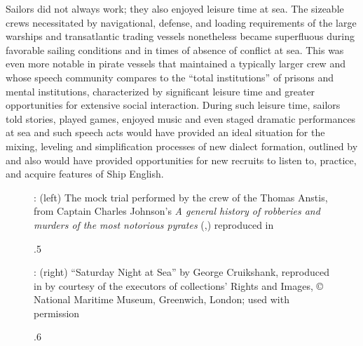 Sailors did not always work; they also enjoyed leisure time at sea. The sizeable crews necessitated by navigational, defense, and loading requirements of the large warships and transatlantic trading vessels nonetheless became superfluous during favorable sailing conditions and in times of absence of conflict at sea. This was even more notable in pirate vessels that maintained a typically larger crew and whose speech community \citet{Burg2001} compares to the “total institutions” of prisons and mental institutions, characterized by significant leisure time and greater opportunities for extensive social interaction. During such leisure time, sailors told stories, played games, enjoyed music and even staged dramatic performances at sea \citep[155]{Rediker2004} and such speech acts would have provided an ideal situation for the mixing, leveling and simplification processes of new dialect formation, outlined by \citet{Trudgill1986} and also would have provided opportunities for new recruits to listen to, practice, and acquire features of Ship English.

\begin{figure}

  
 

 
\caption{\label{fig:key:4}.5}: (left) The mock trial performed by the crew of the Thomas Anstis, from Captain Charles Johnson’s \textit{A general history of robberies and murders of the most notorious pyrates} (\citealt{London1724},) reproduced in \citet[156]{Rediker2004} 

\end{figure}

\begin{figure}

\caption{\label{fig:key:4}.6}: (right) “Saturday Night at Sea” by George Cruikshank, reproduced in \citet[29,]{Dibdin1841} by courtesy of the executors of collections’ Rights and Images, © National Maritime Museum, Greenwich, London; used with permission
\end{figure}


